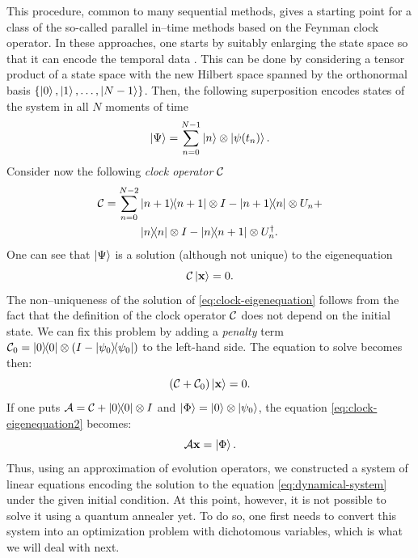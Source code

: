 This procedure, common to many sequential methods, gives a starting point for a
class of the so-called parallel in--time methods based on the Feynman clock
operator. In these approaches, one starts by suitably enlarging the state space
so that it can encode the temporal data \cite{feynmanclock}. This can be done
by considering a tensor product of a state space with the new Hilbert space
spanned by the orthonormal basis $\{\ket{0}, \ket{1}, \ldots, \ket{N-1}\}$.
Then, the following superposition encodes states of the system in all $N$
moments of time
%
\begin{equation}
  \ket{\Psi} = \sum_{n=0}^{N-1} \ket{n} \otimes \ket{\psi(t_n)}.
\end{equation}
Consider now the following \emph{clock operator} $\mathcal{C}$
\begin{equation}
  \label{eq:clock2}
  \begin{split}
    \mathcal{C}
    =
    \sum_{n=0}^{N-2}
    &\ketbra{n+1}{n+1} \otimes I - \ketbra{n+1}{n} \otimes U_n + \\
    &\ketbra{n}{n} \otimes I - \ketbra{n}{n+1}\otimes U_{n}^{\dagger}.
  \end{split}
\end{equation}
One can see that $\ket{\Psi}$ is a solution (although not unique) to the
eigenequation
\begin{equation}
  \label{eq:clock-eigenequation}
  \mathcal{C} \ket{\mathbf{x}} = 0.
\end{equation}
The non--uniqueness of the solution of \eqref{eq:clock-eigenequation} follows
from the fact that the definition of the clock operator $\mathcal{C}$ does not
depend on the initial state. We can fix this problem by adding a \emph{penalty}
term $\mathcal{C}_0 = \ketbra{0}{0}\otimes(I-\ketbra{\psi_0}{\psi_0})$ to the
left-hand side. The equation to solve becomes then:
\begin{equation}
  \label{eq:clock-eigenequation2}
  (\mathcal{C} + \mathcal{C}_0) \ket{\mathbf{x}} = 0.
\end{equation}
If one puts $\mathcal{A}=\mathcal{C} + \ketbra{0}{0} \otimes I$ and $\ket{\Phi} =
  \ket{0}\otimes \ket{\psi_0}$, the equation \eqref{eq:clock-eigenequation2}
becomes:
\begin{equation}
  \label{eq:gsys}
  \mathcal{A} \mathbf{x} = \ket{\Phi}.
\end{equation}
Thus, using an approximation of evolution operators, we constructed a system of
linear equations encoding the solution to the equation
\eqref{eq:dynamical-system} under the given initial condition. At this point,
however, it is not possible to solve it using a quantum annealer yet. To do so,
one first needs to convert this system into an optimization problem with
dichotomous variables, which is what we will deal with next.
